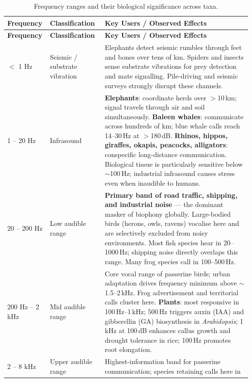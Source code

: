\documentclass[12pt, a4paper]{article}
\newcommand{\Hz}[1]{\texttt{\textbf{\textcolor{forestgreen}{#1}}}}
\begin{document}
\begin{longtable}{>{\Hz{}}p{2.7cm} p{2.8cm} p{8cm}}
\caption{Frequency ranges and their biological significance across taxa.}
\label{tab:frequencies} \\
\toprule
\textbf{Frequency} & \textbf{Classification} & \textbf{Key Users / Observed Effects} \\
\midrule
\endfirsthead
\toprule
\textbf{Frequency} & \textbf{Classification} & \textbf{Key Users / Observed Effects} \\
\midrule
\endhead
\bottomrule
\endfoot

$<$ 1 Hz
  & Seismic / substrate vibration
  & Elephants detect seismic rumbles through feet and bones over tens of km. Spiders and insects
    sense substrate vibrations for prey detection and mate signalling.
    Pile-driving and seismic surveys strongly disrupt these channels. \\
\rowcolor{rowshade}
1 -- 20 Hz
  & Infrasound
  & \textbf{Elephants}: coordinate herds over $>$10\,km; signal travels through air and soil
    simultaneously.
    \textbf{Baleen whales}: communicate across hundreds of km; blue whale calls reach
    14--30\,Hz at $>$180\,dB.
    \textbf{Rhinos, hippos, giraffes, okapis, peacocks, alligators}: conspecific
    long-distance communication.
    Biological tissue is particularly sensitive below $\sim$100\,Hz; industrial
    infrasound causes stress even when inaudible to humans. \\
20 -- 200 Hz
  & Low audible range
  & \textbf{Primary band of road traffic, shipping, and industrial noise} --- the dominant
    masker of biophony globally.
    Large-bodied birds (herons, owls, ravens) vocalise here and are selectively excluded
    from noisy environments.
    Most fish species hear in 20--1000\,Hz; shipping noise directly overlaps this range.
    Many frog species call in 100--500\,Hz. \\
\rowcolor{rowshade}
200 Hz -- 2 kHz
  & Mid audible range
  & Core vocal range of passerine birds; urban adaptation drives frequency minimum above
    $\sim$1.5--2\,kHz.
    Frog advertisement and territorial calls cluster here.
    \textbf{Plants}: most responsive in 100\,Hz--1\,kHz; 500\,Hz triggers auxin (IAA) and
    gibberellin (GA) biosynthesis in \textit{Arabidopsis}; 1\,kHz at 100\,dB enhances
    callus growth and drought tolerance in rice; 100\,Hz promotes root elongation. \\
2 -- 8 kHz
  & Upper audible range
  & Highest-information band for passerine communication; species retaining calls here in

\end{longtable}
\end{document}
